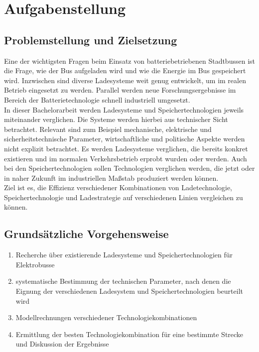 \chapter*{Aufgabenstellung}

\section*{Problemstellung und Zielsetzung}
Eine der wichtigsten Fragen beim Einsatz von batteriebetriebenen Stadtbussen ist die Frage, wie der Bus aufgeladen wird und wie die Energie im Bus gespeichert wird. Inzwischen sind diverse Ladesysteme weit genug entwickelt, um im realen Betrieb eingesetzt zu werden. Parallel werden neue Forschungsergebnisse im Bereich der Batterietechnologie schnell industriell umgesetzt.\\
In dieser Bachelorarbeit werden Ladesysteme und Speichertechnologien jeweils miteinander verglichen. Die Systeme werden hierbei aus technischer Sicht betrachtet. Relevant sind zum Beispiel mechanische, elektrische und sicherheitstechnische Parameter, wirtschaftliche und politische Aspekte werden nicht explizit betrachtet. Es werden Ladesysteme verglichen, die bereits konkret existieren und im normalen Verkehrsbetrieb erprobt wurden oder werden. Auch bei den Speichertechnologien sollen Technologien verglichen werden, die jetzt oder in naher Zukunft im industriellen Maßstab produziert werden können.\\
Ziel ist es, die Effizienz verschiedener Kombinationen von Ladetechnologie, Speichertechnologie und Ladestrategie auf verschiedenen Linien vergleichen zu können.

\section*{Grundsätzliche Vorgehensweise}
\begin{enumerate}
	\item Recherche über existierende Ladesysteme und Speichertechnologien für Elektrobusse
	\item systematische Bestimmung der technischen Parameter, nach denen die Eignung der verschiedenen Ladesystem und Speichertechnologien beurteilt wird
	\item Modellrechnungen verschiedener Technologiekombinationen
	\item Ermittlung der besten Technologiekombination für eine bestimmte Strecke und Diskussion der Ergebnisse
\end{enumerate}